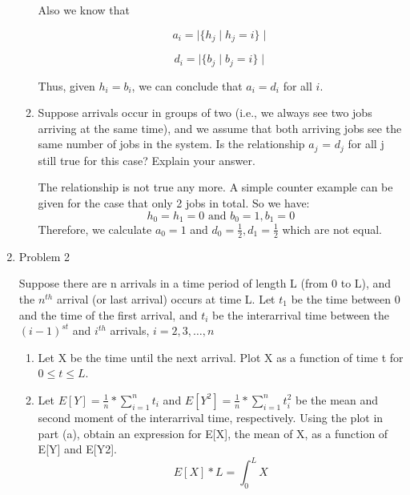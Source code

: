 \documentclass[letterpaper]{article}
\begin{document}
\begin{enumerate}
\begin{enumerate}
Also we know that

\begin{equation}
a_i = \mid \{h_j \mid h_j = i\} \mid
\end{equation}

\begin{equation}
d_i = \mid \{b_j \mid b_j = i\} \mid
\end{equation}

Thus, given $h_i = b_i$, we can conclude that $a_i = d_i$ for all $i$.
\item{} Suppose arrivals occur in groups of two (i.e., we always see two jobs arriving at the same time), and we assume that both arriving jobs see the same number of jobs in the system. Is the relationship $a_j$ = $d_j$ for all j still true for this case? Explain your answer.

The relationship is not true any more. A simple counter example can be given for the case that only 2 jobs in total. So we have:
\begin{equation}
h_0=h_1=0 \text{ and }b_0=1,b_1=0
\end{equation}
Therefore, we calculate $a_0=1$ and $d_0=\frac{1}{2}, d_1=\frac{1}{2}$ which are not equal.

\end{enumerate}
\medskip

\item{Problem 2}

Suppose there are n arrivals in a time period of length L (from 0 to L), and the $n^{th}$ arrival (or last arrival) occurs at time L. Let $t_1$ be the time between 0 and the time of the first arrival, and $t_i$ be the interarrival time between the $(i-1)^{st}$ and $i^{th}$ arrivals, $i = 2, 3, \dotsc, n$
\begin{enumerate}
\item{} Let X be the time until the next arrival. Plot X as a function of time t for $0 \le t \le L$.


\item{} Let $E[Y] = \frac{1}{n} * \sum^{n}_{i=1}{t_i}$ and $E[Y^2] = \frac{1}{n} * \sum^{n}_{i=1}{t_i^2}$ be the mean and second moment of the interarrival time, respectively. Using the plot in part (a), obtain an expression for E[X], the mean of X, as a function of E[Y] and E[Y2].
\begin{equation}
E[X] * L = \int_{0}^{L}{X}
\end{equation}


\end{enumerate}
\end{enumerate}
\end{document}
